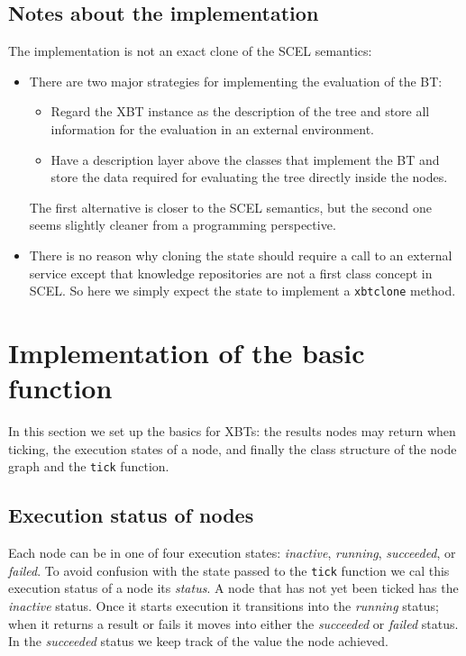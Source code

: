 \documentclass[a4wide]{article}
\begin{document}
\subsection{Notes about the implementation}
\label{sec-2-2}

The implementation is not an exact clone of the SCEL semantics:

\begin{itemize}
\item There are two major strategies for implementing the evaluation of
the BT: 

\begin{itemize}
\item Regard the XBT instance as the description of the tree and
store all information for the evaluation in an external
environment.
\item Have a description layer above the classes that implement the
BT and store the data required for evaluating the tree directly
inside the nodes.
\end{itemize}
The first alternative is closer to the SCEL semantics, but the
second one seems slightly cleaner from a programming
perspective.

\item There is no reason why cloning the state should require a call to
an external service except that knowledge repositories are not a
first class concept in SCEL.  So here we simply expect the state
to implement a \verb~xbtclone~ method.
\end{itemize}

\section{Implementation of the basic function}
\label{sec-3}

In this section we set up the basics for XBTs: the results nodes may
return when ticking, the execution states of a node, and finally the
class structure of the node graph and the \verb~tick~ function.

\subsection{Execution status of nodes}
\label{sec-3-1}

Each node can be in one of four execution states: \emph{inactive},
\emph{running}, \emph{succeeded}, or \emph{failed}.  To avoid confusion with the
state passed to the \verb~tick~ function we cal this execution status of
a node its \emph{status}.  A node that has not yet been ticked has the
\emph{inactive} status.  Once it starts execution it transitions into the
\emph{running} status; when it returns a result or fails it moves into
either the \emph{succeeded} or \emph{failed} status.  In the \emph{succeeded}
status we keep track of the value the node achieved.
\end{document}
